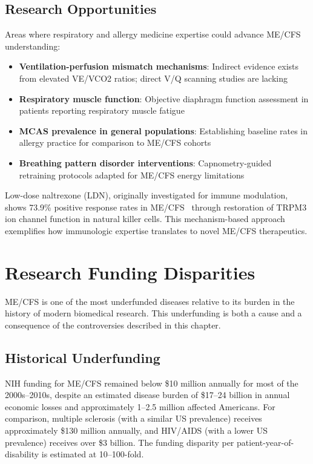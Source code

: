\subsection{Research Opportunities}

Areas where respiratory and allergy medicine expertise could advance ME/CFS understanding:

\begin{itemize}
    \item \textbf{Ventilation-perfusion mismatch mechanisms}: Indirect evidence exists from elevated VE/VCO2 ratios; direct V/Q scanning studies are lacking
    \item \textbf{Respiratory muscle function}: Objective diaphragm function assessment in patients reporting respiratory muscle fatigue
    \item \textbf{MCAS prevalence in general populations}: Establishing baseline rates in allergy practice for comparison to ME/CFS cohorts
    \item \textbf{Breathing pattern disorder interventions}: Capnometry-guided retraining protocols adapted for ME/CFS energy limitations
\end{itemize}

\begin{achievement}
Low-dose naltrexone (LDN), originally investigated for immune modulation, shows 73.9\% positive response rates in ME/CFS~\cite{Cabanas2021} through restoration of TRPM3 ion channel function in natural killer cells. This mechanism-based approach exemplifies how immunologic expertise translates to novel ME/CFS therapeutics.
\end{achievement}

\section{Research Funding Disparities}
\label{sec:funding-disparities}

ME/CFS is one of the most underfunded diseases relative to its burden in the history of modern biomedical research. This underfunding is both a cause and a consequence of the controversies described in this chapter.

\subsection{Historical Underfunding}

NIH funding for ME/CFS remained below \$10 million annually for most of the 2000s--2010s, despite an estimated disease burden of \$17--24 billion in annual economic losses and approximately 1--2.5 million affected Americans. For comparison, multiple sclerosis (with a similar US prevalence) receives approximately \$130 million annually, and HIV/AIDS (with a lower US prevalence) receives over \$3 billion. The funding disparity per patient-year-of-disability is estimated at 10--100-fold.

